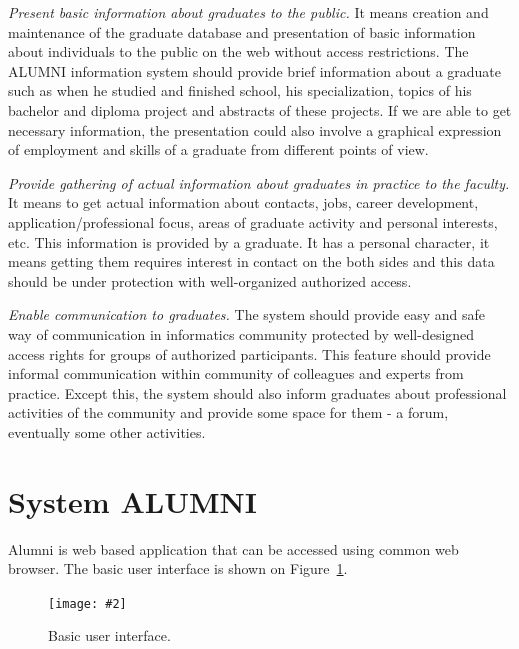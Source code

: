 \documentclass{iitsrc}[2006/14/02]
\newcommand\fig[4]{%
	\begin{figure}[h]
	\begin{center}
	\texttt{[image: \#2]}
	~\\%
	\caption{#4}
	\label{#3}
	\end{center}
	\end{figure}
}
\begin{document}
{\em Present basic information about graduates to the public.}
It means creation and maintenance of the graduate database and presentation of basic information about individuals to the public on the web without access restrictions. The ALUMNI information system should provide brief information about a graduate such as when he studied and finished school, his specialization, topics of his bachelor and diploma project and abstracts of these projects. If we are able to get necessary information, the presentation could also involve a graphical expression of employment and skills of a graduate from different points of view.

{\em Provide gathering of actual information about graduates in practice to the faculty.} 
It means to get actual information about contacts, jobs, career development, application/professional focus, areas of graduate activity and personal interests, etc. This information is provided by a graduate. It has a personal character, it means getting them requires interest in contact on the both sides and this data should be under protection with well-organized authorized access.

{\em Enable communication to graduates.}
The system should provide easy and safe way of communication in informatics community protected by well-designed access rights for groups of authorized participants. This feature should provide informal communication within community of colleagues and experts from practice. Except this, the system should also inform graduates about professional activities of the community and provide some space for them - a forum, eventually some other activities.


\section{System ALUMNI}

Alumni is web based application that can be accessed using common web browser. The basic user interface is shown on Figure~\ref{fig:scr1}. 

\fig{width=12cm, bb = 0 0 831 683}{images/screen1.png}{fig:scr1}{Basic user interface.}
\end{document}

